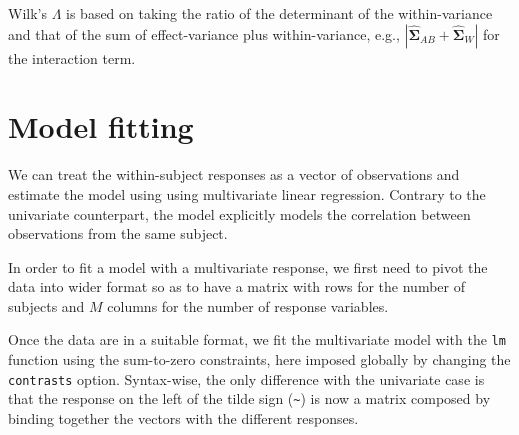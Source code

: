 \documentclass[
  11pt,
  letterpaper,
]{scrbook}
\theoremstyle{definition}
\theoremstyle{definition}
\theoremstyle{remark}
\begin{document}
Wilk's \(\Lambda\) is based on taking the ratio of the determinant of
the within-variance and that of the sum of effect-variance plus
within-variance, e.g.,
\(|\widehat{\boldsymbol{\Sigma}}_{AB} + \widehat{\boldsymbol{\Sigma}}_W|\)
for the interaction term.

\section{Model fitting}\label{model-fitting}

We can treat the within-subject responses as a vector of observations
and estimate the model using using multivariate linear regression.
Contrary to the univariate counterpart, the model explicitly models the
correlation between observations from the same subject.

In order to fit a model with a multivariate response, we first need to
pivot the data into wider format so as to have a matrix with rows for
the number of subjects and \(M\) columns for the number of response
variables.

Once the data are in a suitable format, we fit the multivariate model
with the \texttt{lm} function using the sum-to-zero constraints, here
imposed globally by changing the \texttt{contrasts} option. Syntax-wise,
the only difference with the univariate case is that the response on the
left of the tilde sign (\texttt{\textasciitilde{}}) is now a matrix
composed by binding together the vectors with the different responses.
\end{document}
